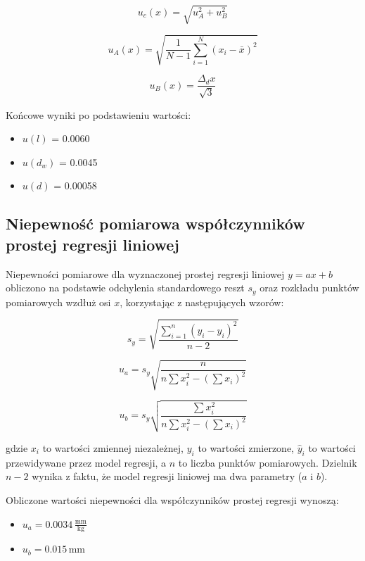 \documentclass[a4paper,12pt]{article}
\begin{document}
\begin{equation}
    \label{eq:u_c}
    u_c(x) = \sqrt{u_A^2 + u_B^2}
\end{equation}

\begin{equation}
    \label{eq:u_A}
    u_A(x) = \sqrt{\frac{1}{N-1} \sum_{i=1}^{N} (x_i - \bar{x})^2}
\end{equation}

\begin{equation}
    \label{eq:u_B}
    u_B(x) = \frac{\Delta_d x}{\sqrt{3}}
\end{equation}

Końcowe wyniki po podstawieniu wartości:

\begin{itemize}
    \item $u(l)$ = 0.0060\,
    \item $u(d_w)$ = 0.0045 
    \item $u(d)$ = 0.00058\,
\end{itemize}



\subsection{Niepewność pomiarowa współczynników prostej regresji liniowej}

Niepewności pomiarowe dla wyznaczonej prostej regresji liniowej $y = ax + b$ obliczono na podstawie odchylenia standardowego reszt $s_y$ oraz rozkładu punktów pomiarowych wzdłuż osi $x$, korzystając z następujących wzorów:

\[
    s_y = \sqrt{\frac{\sum_{i=1}^{n} (y_i - \hat{y}_i)^2}{n-2}}
\]

\[
    u_a = s_y \sqrt{\frac{n}{n \sum x_i^2 - \left( \sum x_i \right)^2}}
\]

\[
    u_b = s_y \sqrt{\frac{\sum x_i^2}{n \sum x_i^2 - \left( \sum x_i \right)^2}}
\]

gdzie $x_i$ to wartości zmiennej niezależnej, $y_i$ to wartości zmierzone, $\hat{y}_i$ to wartości przewidywane przez model regresji, a $n$ to liczba punktów pomiarowych. Dzielnik $n-2$ wynika z faktu, że model regresji liniowej ma dwa parametry ($a$ i $b$).


Obliczone wartości niepewności dla współczynników prostej regresji wynoszą:

\begin{itemize}
    \item $u_a = 0.0034\,\frac{\text{mm}}{\text{kg}}$
    \item $u_b = 0.015\,\text{mm}$
\end{itemize}
\end{document}
